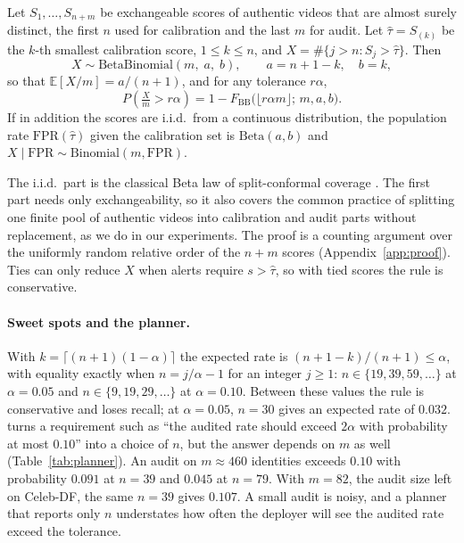 \begin{proposition}
\label{prop:bb}
Let $S_1,\dots,S_{n+m}$ be exchangeable scores of authentic videos that are almost surely distinct, the first $n$ used for calibration and the last $m$ for audit. Let $\hat\tau=S_{(k)}$ be the $k$-th smallest calibration score, $1\le k\le n$, and $X=\#\{j>n: S_j>\hat\tau\}$. Then
\begin{equation}
X\sim\mathrm{BetaBinomial}(m,\;a,\;b),\qquad a=n+1-k,\quad b=k,
\label{eq:bb}
\end{equation}
so that $\mathbb{E}[X/m]=a/(n+1)$, and for any tolerance $r\alpha$,
\begin{equation}
P\!\left(\tfrac{X}{m}>r\alpha\right)=1-F_{\mathrm{BB}}\big(\lfloor r\alpha m\rfloor;\,m,a,b\big).
\label{eq:pviol}
\end{equation}
If in addition the scores are i.i.d.\ from a continuous distribution, the population rate $\mathrm{FPR}(\hat\tau)$ given the calibration set is $\mathrm{Beta}(a,b)$ and $X\mid\mathrm{FPR}\sim\mathrm{Binomial}(m,\mathrm{FPR})$.
\end{proposition}

The i.i.d.\ part is the classical Beta law of split-conformal coverage \citep{vovk2012conditional,bates2023testing}. The first part needs only exchangeability, so it also covers the common practice of splitting one finite pool of authentic videos into calibration and audit parts without replacement, as we do in our experiments. The proof is a counting argument over the uniformly random relative order of the $n+m$ scores (Appendix~\ref{app:proof}). Ties can only reduce $X$ when alerts require $s>\hat\tau$, so with tied scores the rule is conservative.

\paragraph{Sweet spots and the planner.}
With $k=\lceil(n+1)(1-\alpha)\rceil$ the expected rate is $(n+1-k)/(n+1)\le\alpha$, with equality exactly when $n=j/\alpha-1$ for an integer $j\ge1$: $n\in\{19,39,59,\dots\}$ at $\alpha=0.05$ and $n\in\{9,19,29,\dots\}$ at $\alpha=0.10$. Between these values the rule is conservative and loses recall; at $\alpha=0.05$, $n=30$ gives an expected rate of $0.032$.  turns a requirement such as ``the audited rate should exceed $2\alpha$ with probability at most $0.10$'' into a choice of $n$, but the answer depends on $m$ as well (Table~\ref{tab:planner}). An audit on $m\approx460$ identities exceeds $0.10$ with probability $0.091$ at $n=39$ and $0.045$ at $n=79$. With $m=82$, the audit size left on Celeb-DF, the same $n=39$ gives $0.107$. A small audit is noisy, and a planner that reports only $n$ understates how often the deployer will see the audited rate exceed the tolerance.

